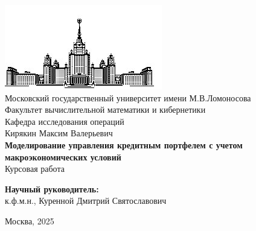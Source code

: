 
% 

  \begin{titlepage}
    \begin{center}
      \includegraphics{img/msu_logo.jpg}
      \normalsize
      \\[0.1cm]
      Московский государственный университет имени М.В.Ломоносова
      \\[0.1cm]
      Факультет вычислительной математики и кибернетики
      \\[0.1cm]
      Кафедра исследования операций
      \\[1.5cm]
      {\Large Кирякин Максим Валерьевич}
      \\[1.0cm]
      \textbf{\Large Моделирование управления кредитным портфелем с учетом макроэкономических условий}
      \\[1.0cm]
      Курсовая работа
      \\[4.0cm]
      \begin{flushright}
      	\normalsize
         \textbf{Научный руководитель:}
         \\
         к.ф.м.н., Куренной Дмитрий Святославович
      \end{flushright}
      \vfill 
      Москва, 2025
    \end{center} 
  \end{titlepage}

% 
